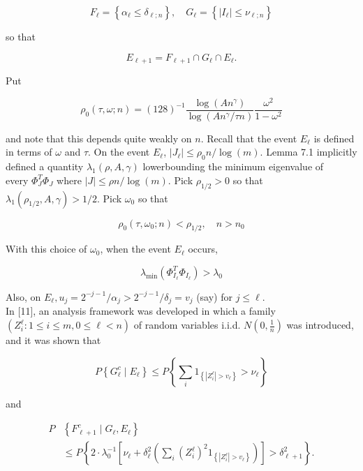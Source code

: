 \documentclass[10pt]{article}
\begin{document}
$$
F_{\ell}=\left\{\alpha_{\ell} \leq \delta_{\ell ; n}\right\}, \quad G_{\ell}=\left\{\left|I_{\ell}\right| \leq \nu_{\ell ; n}\right\}
$$

so that

$$
E_{\ell+1}=F_{\ell+1} \cap G_{\ell} \cap E_{\ell} .
$$

Put

$$
\rho_{0}(\tau, \omega ; n)=(128)^{-1} \frac{\log \left(A n^{\gamma}\right)}{\log \left(A n^{\gamma} / \tau n\right)} \frac{\omega^{2}}{1-\omega^{2}}
$$

and note that this depends quite weakly on $n$. Recall that the event $E_{\ell}$ is defined in terms of $\omega$ and $\tau$. On the event $E_{\ell}$, $\left|J_{\ell}\right| \leq \rho_{0} n / \log (m)$. Lemma 7.1 implicitly defined a quantity $\lambda_{1}(\rho, A, \gamma)$ lowerbounding the minimum eigenvalue of\\
every $\Phi_{J}^{T} \Phi_{J}$ where $|J| \leq \rho n / \log (m)$. Pick $\rho_{1 / 2}>0$ so that $\lambda_{1}\left(\rho_{1 / 2}, A, \gamma\right)>1 / 2$. Pick $\omega_{0}$ so that

$$
\rho_{0}\left(\tau, \omega_{0} ; n\right)<\rho_{1 / 2}, \quad n>n_{0}
$$

With this choice of $\omega_{0}$, when the event $E_{\ell}$ occurs,

$$
\lambda_{\min }\left(\Phi_{I_{\ell}}^{T} \Phi_{I_{\ell}}\right)>\lambda_{0}
$$

Also, on $E_{\ell}, u_{j}=2^{-j-1} / \alpha_{j}>2^{-j-1} / \delta_{j}=v_{j}$ (say) for $j \leq \ell$.\\[0pt]
In [11], an analysis framework was developed in which a family $\left(Z_{i}^{\ell}: 1 \leq i \leq m, 0 \leq \ell<n\right)$ of random variables i.i.d. $N\left(0, \frac{1}{n}\right)$ was introduced, and it was shown that

$$
P\left\{G_{\ell}^{c} \mid E_{\ell}\right\} \leq P\left\{\sum_{i} 1_{\left\{\left|Z_{i}^{\ell}\right|>v_{\ell}\right\}}>\nu_{\ell}\right\}
$$

and

$$
\begin{aligned}
P & \left\{F_{\ell+1}^{c} \mid G_{\ell}, E_{\ell}\right\} \\
& \leq P\left\{2 \cdot \lambda_{0}^{-1}\left[\nu_{\ell}+\delta_{\ell}^{2}\left(\sum_{i}\left(Z_{i}^{\ell}\right)^{2} 1_{\left\{\left|Z_{i}^{\ell}\right|>v_{\ell}\right\}}\right)\right]>\delta_{\ell+1}^{2}\right\} .
\end{aligned}
$$
\end{document}
